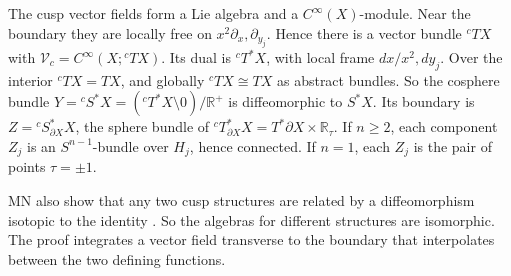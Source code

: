 \documentclass[11pt,oneside,reqno]{article}
\newcommand{\R}{\mathbb R}
\newcommand{\CI}{C^\infty}
\newcommand{\Y}{{}^cS^*X}
\newcommand{\Zb}{{}^cS^*_{\partial X}X}
\newcommand{\cT}{{}^cT^*X}
\theoremstyle{plain}
\theoremstyle{definition}
\theoremstyle{remark}
\begin{document}
The cusp vector fields form a Lie algebra and a \(\CI(X)\)-module. Near the
boundary they are locally free on \(x^2\partial_x,\partial_{y_j}\). Hence
there is a vector bundle \({}^cTX\) with \(\mathcal V_c=\CI(X;{}^cTX)\).
Its dual is \(\cT\), with local frame \(dx/x^2,dy_j\). Over the interior
\({}^cTX=TX\), and globally \({}^cTX\cong TX\) as abstract bundles. So the
cosphere bundle \(Y=\Y=(\cT\setminus0)/\R^+\) is diffeomorphic to \(S^*X\).
Its boundary is \(Z=\Zb\), the sphere bundle of
\({}^cT^*_{\partial X}X=T^*\partial X\times\R_\tau\). If \(n\ge2\), each
component \(Z_j\) is an \(S^{n-1}\)-bundle over \(H_j\), hence connected.
If \(n=1\), each \(Z_j\) is the pair of points \(\tau=\pm1\).

MN also show that any two cusp structures are related by a diffeomorphism
isotopic to the identity \cite[Lemma~19]{MN}. So the algebras for
different structures are isomorphic. The proof integrates a vector field
transverse to the boundary that interpolates between the two defining
functions.
\end{document}
